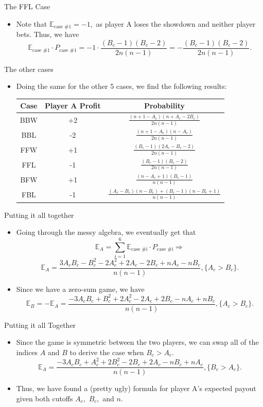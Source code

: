 \documentclass[aspectratio=169]{beamer}
\begin{document}
\begin{frame}{The FFL Case}
    \begin{itemize}
        \item Note that $\mathbb{E}_{\text{case \#1}} = -1,$ as player A loses the showdown and neither player bets. Thus, we have $$\mathbb{E}_{\text{case \#1}} \cdot P_{\text{case \#1}} = -1 \cdot \frac{(B_c-1)(B_c-2)}{2n(n-1)} = -\frac{(B_c-1)(B_c-2)}{2n(n-1)}.$$
    \end{itemize}
\end{frame}
\begin{frame}{The other cases}
\begin{itemize}
    \item Doing the same for the other 5 cases, we find the following results: \begin{tabular}{|c|c|c|}
\hline
Case & Player A Profit & Probability  \\ 
\hline 
\hline
BBW & +2 & $\frac{(n+1-A_c)(n+A_c-2B_c)}{2n(n-1)}$ \\
\hline
BBL & -2 & $\frac{(n+1-A_c)(n-A_c)}{2n(n-1)}$  \\  
\hline
FFW & +1 & $\frac{(B_c-1)(2A_c-B_c-2)}{2n(n-1)}$ \\
\hline
FFL & -1 & $\frac{(B_c-1)(B_c-2)}{2n(n-1)}$ \\
\hline
BFW & +1 & $\frac{(n-A_c+1)(B_c-1)}{n(n-1)}$ \\
\hline
FBL & -1 & $\frac{(A_c-B_c)(n-B_c)+(B_c-1)(n-B_c+1)}{n(n-1)}$ \\
\hline
\end{tabular}
\end{itemize}
\end{frame}
\begin{frame}{Putting it all together}
\begin{itemize} 
    \item Going through the messy algebra, we eventually get that $$\mathbb{E}_A = \sum_{i=1}^{6}\mathbb{E}_{\text{case \#i}} \cdot P_{\text{case \#i}} \Longrightarrow$$ $$ \mathbb{E}_A =\frac{3A_cB_c-B_c^2-2A_c^2+2A_c-2B_c+nA_c-nB_c}{n(n-1)},\{A_c > B_c\}.$$ 
    \item Since we have a zero-sum game, we have $$\mathbb{E}_B = -\mathbb{E}_A = \frac{-3A_cB_c+B_c^2+2A_c^2-2A_c+2B_c-nA_c+nB_c}{n(n-1)},\{A_c>B_c\}.$$
    \end{itemize}
\end{frame}
\begin{frame}{Putting it all Together}
\begin{itemize}
    \item Since the game is symmetric between the two players, we can swap all of the indices $A$ and $B$ to derive the case when $B_c > A_c.$ $$\mathbb{E}_A = \frac{-3A_cB_c+A_c^2+2B_c^2-2B_c+2A_c-nB_c+nA_c}{n(n-1)},\{B_c > A_c\}.$$
    \item Thus, we have found a (pretty ugly) formula for player A's expected payout given both cutoffs $A_c,$ $B_c,$ and $n.$ 
    \end{itemize}
\end{frame}
\end{document}

